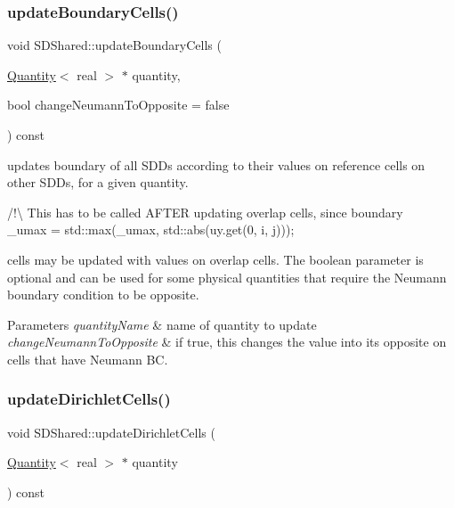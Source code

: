\subsubsection{\texorpdfstring{update\+Boundary\+Cells()}{updateBoundaryCells()}}
{\footnotesize\ttfamily void S\+D\+Shared\+::update\+Boundary\+Cells (\begin{DoxyParamCaption}\item[{\mbox{\hyperlink{classQuantity}{Quantity}}$<$ real $>$ $\ast$}]{quantity,  }\item[{bool}]{change\+Neumann\+To\+Opposite = {\ttfamily false} }\end{DoxyParamCaption}) const}



updates boundary of all S\+D\+Ds according to their values on reference cells on other S\+D\+Ds, for a given quantity. 

/!\textbackslash{} This has to be called A\+F\+T\+ER updating overlap cells, since boundary ~\newline
 \+\_\+umax = std\+::max(\+\_\+umax, std\+::abs(uy.\+get(0, i, j)));

cells may be updated with values on overlap cells. The boolean parameter is optional and can be used for some physical quantities that require the Neumann boundary condition to be opposite.


\begin{DoxyParams}{Parameters}
{\em quantity\+Name} & name of quantity to update \\
\hline
{\em change\+Neumann\+To\+Opposite} & if true, this changes the value into its opposite on cells that have Neumann BC. \\
\hline
\end{DoxyParams}
\mbox{\label{classSDShared_a0c83e8c7a830c2febcfc944f57fe158b}} 
\subsubsection{\texorpdfstring{update\+Dirichlet\+Cells()}{updateDirichletCells()}}
{\footnotesize\ttfamily void S\+D\+Shared\+::update\+Dirichlet\+Cells (\begin{DoxyParamCaption}\item[{\mbox{\hyperlink{classQuantity}{Quantity}}$<$ real $>$ $\ast$}]{quantity }\end{DoxyParamCaption}) const}



